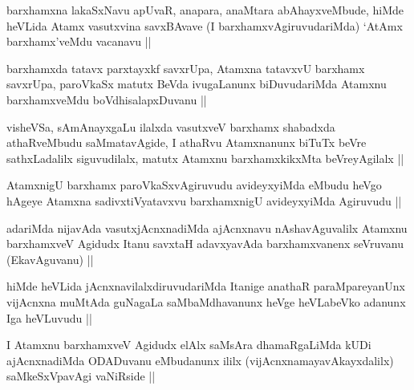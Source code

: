 \begin{artha}
barxhamxna lakaSxNavu apUvaR, anapara, anaMtara abAhayxveMbude, hiMde
heVLida Atamx vasutxvina savxBAvave (I barxhamxvAgiruvudariMda) `AtAmx
barxhamx'veMdu vacanavu ||
\end{artha}

\begin{artha}
barxhamxda tatavx parxtayxkf savxrUpa, Atamxna tatavxvU barxhamx
savxrUpa, paroVkaSx matutx BeVda ivugaLanunx biDuvudariMda Atamxnu
barxhamxveMdu boVdhisalapxDuvanu || 
\end{artha}


\begin{artha}
visheVSa, sAmAnayxgaLu ilalxda vasutxveV barxhamx shabadxda
athaRveMbudu saMmatavAgide, I athaRvu Atamxnanunx biTuTx beVre
sathxLadalilx siguvudilalx, matutx Atamxnu barxhamxkikxMta
beVreyAgilalx ||
\end{artha}


\begin{artha}
AtamxnigU barxhamx paroVkaSxvAgiruvudu avideyxyiMda eMbudu heVgo
hAgeye Atamxna sadivxtiVyatavxvu barxhamxnigU avideyxyiMda Agiruvudu ||
\end{artha}

\begin{artha}
adariMda nijavAda vasutxjAcnxnadiMda ajAcnxnavu nAshavAguvalilx
Atamxnu barxhamxveV Agidudx Itanu savxtaH adavxyavAda barxhamxvanenx
seVruvanu (EkavAguvanu) ||
\end{artha}


\begin{artha}
hiMde heVLida jAcnxnavilalxdiruvudariMda Itanige anathaR
paraMpareyanUnx vijAcnxna muMtAda guNagaLa saMbaMdhavanunx heVge
heVLabeVko adanunx Iga heVLuvudu ||
\end{artha}


\begin{artha}
I Atamxnu barxhamxveV Agidudx elAlx saMsAra dhamaRgaLiMda kUDi
ajAcnxnadiMda ODADuvanu eMbudanunx ililx (vijAcnxnamayavAkayxdalilx)
saMkeSxVpavAgi vaNiRside ||
\end{artha}

